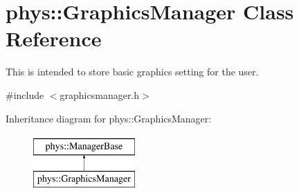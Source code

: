 \hypertarget{classphys_1_1GraphicsManager}{
\section{phys::GraphicsManager Class Reference}
\label{dd/d63/classphys_1_1GraphicsManager}
}


This is intended to store basic graphics setting for the user.  




{\ttfamily \#include $<$graphicsmanager.h$>$}

Inheritance diagram for phys::GraphicsManager:\begin{figure}[H]
\begin{center}
\leavevmode
\includegraphics[height=2.000000cm]{dd/d63/classphys_1_1GraphicsManager}
\end{center}
\end{figure}
